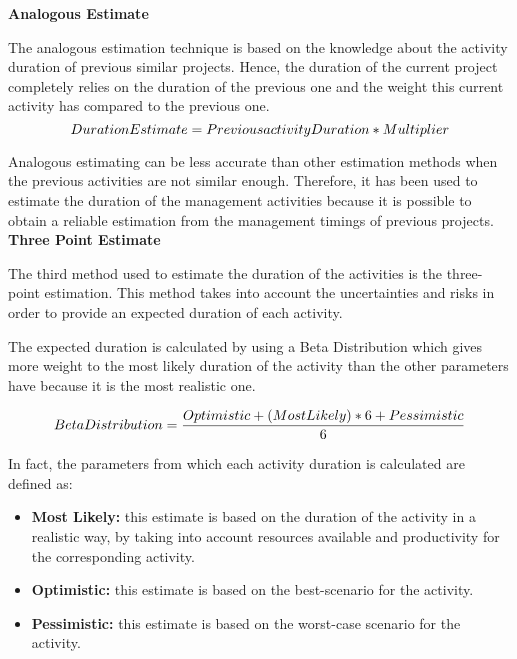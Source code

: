 \textbf{Analogous Estimate}

The analogous estimation technique is based on the knowledge about the activity duration of previous similar projects. Hence, the duration of the current project completely relies on the duration of the previous one and the weight this current activity has compared to the previous one. 
\begin{equation}
\centering
\notag Duration Estimate=Previous activity Duration * Multiplier
\end{equation}

Analogous estimating can be less accurate than other estimation methods when the previous activities are not similar enough. Therefore, it has been used to estimate the duration of the management activities because it is possible to obtain a reliable estimation from the management timings of previous projects. \\

\textbf{Three Point Estimate}

The third method used to estimate the duration of the activities is the three-point estimation. This method takes into account the uncertainties and risks in order to provide an expected duration of each activity. 

The expected duration is calculated by using a Beta Distribution which gives more weight to the most likely duration of the activity than the other parameters have because it is the most realistic one.

\begin{equation}
\centering
\notag Beta Distribution=\frac{Optimistic + (Most Likely) * 6 + Pessimistic}{6}
\end{equation}

In fact, the parameters from which each activity duration is calculated are defined as: 

\begin{itemize}

\item \textbf{Most Likely:} this estimate is based on the duration of the activity in a realistic way, by taking into account resources available and productivity for the corresponding activity. 

\item \textbf{Optimistic:} this estimate is based on the best-scenario for the activity. 

\item \textbf{Pessimistic:} this estimate is based on the worst-case scenario for the activity. 

\end{itemize}

